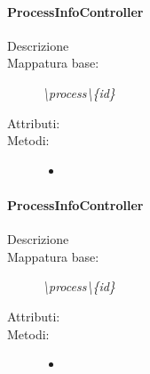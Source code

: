 \paragraph{ProcessInfoController}%
\begin{description}
	\item[Descrizione] 
	\item[Mappatura base:] \textit{\textbackslash process\textbackslash \{id\}}
	\item[Attributi:]
	\item[Metodi:]\begin{itemize}
					\item 
				\end{itemize}
\end{description}
\paragraph{ProcessInfoController}%
\begin{description}
	\item[Descrizione] 
	\item[Mappatura base:] \textit{\textbackslash process\textbackslash \{id\}}
	\item[Attributi:]
	\item[Metodi:]\begin{itemize}
					\item 
				\end{itemize}
\end{description}
